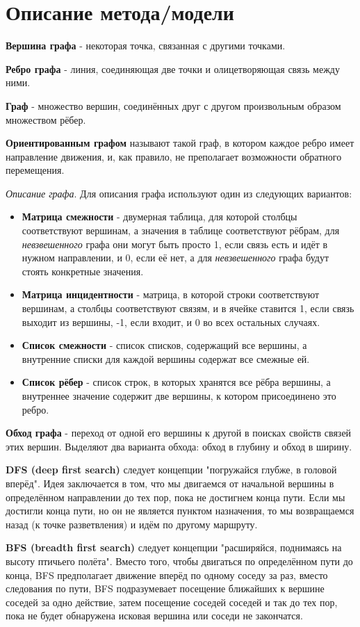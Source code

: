 \documentclass[12pt, a4paper]{report}
\begin{document}
	\section*{Описание метода/модели}
	\large
	\textbf{Вершина графа} - некоторая точка, связанная с другими точками. \par
	\textbf{Ребро графа} - линия, соединяющая две точки и олицетворяющая связь между ними. \par
	\textbf{Граф} - множество вершин, соединённых друг с другом произвольным образом множеством рёбер. \par
	\textbf{Ориентированным графом} называют такой граф, в котором каждое ребро имеет направление движения, и, как правило, не преполагает возможности обратного перемещения. \par
	\textit{Описание графа}. Для описания графа используют один из следующих вариантов:
	\begin{itemize}
		\item \textbf{Матрица смежности} - двумерная таблица, для которой столбцы соответствуют вершинам, а значения в таблице соответствуют рёбрам, для \textit{невзвешенного} графа они могут быть просто 1, если связь есть и идёт в нужном направлении, и 0, если её нет, а для \textit{невзвешенного} графа будут стоять конкретные значения.
		\item \textbf{Матрица инцидентности} - матрица, в которой строки соответствуют вершинам, а столбцы соответствуют связям, и в ячейке ставится 1, если связь выходит из вершины, -1, если входит, и 0 во всех остальных случаях.
		\item \textbf{Список смежности} - список списков, содержащий все вершины, а внутренние списки для каждой вершины содержат все смежные ей.
		\item \textbf{Список рёбер} - список строк, в которых хранятся все рёбра вершины, а внутреннее значение содержит две вершины, к котором присоединено это ребро.
	\end{itemize}
	\par
	\textbf{Обход графа} - переход от одной его вершины к другой в поисках свойств связей этих вершин. Выделяют два варианта обхода: обход в глубину и обход в ширину. \par
	\textbf{DFS (deep first search)} следует концепции "погружайся глубже, в головой вперёд". Идея заключается в том, что мы двигаемся от начальной вершины в определённом направлении до тех пор, пока не достигнем конца пути. Если мы достигли конца пути, но он не является пунктом назначения, то мы возвращаемся назад (к точке разветвления) и идём по другому маршруту. \par
	\textbf{BFS (breadth first search)} следует концепции "расширяйся, поднимаясь на высоту птичьего полёта". Вместо того, чтобы двигаться по определённом пути до конца, BFS предполагает движение вперёд по одному соседу за раз, вместо следования по пути, BFS подразумевает посещение ближайших к вершине соседей за одно действие, затем посещение соседей соседей и так до тех пор, пока не будет обнаружена исковая вершина или соседи не закончатся.
\end{document}
